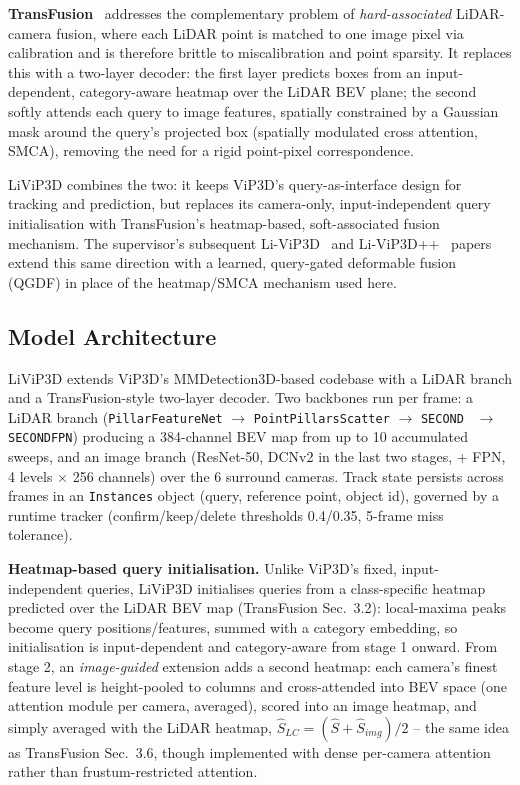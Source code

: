 \documentclass[12pt,a4paper]{report}
\begin{document}
\quad \textbf{TransFusion}~\cite{Bai2022TransFusion} addresses the complementary problem of \emph{hard-associated} LiDAR-camera fusion, where each LiDAR point is matched to one image pixel via calibration and is therefore brittle to miscalibration and point sparsity. It replaces this with a two-layer decoder: the first layer predicts boxes from an input-dependent, category-aware heatmap over the LiDAR BEV plane; the second softly attends each query to image features, spatially constrained by a Gaussian mask around the query's projected box (spatially modulated cross attention, SMCA), removing the need for a rigid point-pixel correspondence.

\quad LiViP3D combines the two: it keeps ViP3D's query-as-interface design for tracking and prediction, but replaces its camera-only, input-independent query initialisation with TransFusion's heatmap-based, soft-associated fusion mechanism. The supervisor's subsequent Li-ViP3D~\cite{Halinkovic2025LiViP3D} and Li-ViP3D++~\cite{Halinkovic2026LiViP3DPP} papers extend this same direction with a learned, query-gated deformable fusion (QGDF) in place of the heatmap/SMCA mechanism used here.

\subsection{Model Architecture}
\quad LiViP3D extends ViP3D's MMDetection3D-based codebase with a LiDAR branch and a TransFusion-style two-layer decoder. Two backbones run per frame: a LiDAR branch (\texttt{PillarFeatureNet} $\to$ \texttt{PointPillarsScatter} $\to$ \texttt{SECOND}~\cite{Yan2018SECOND} $\to$ \texttt{SECONDFPN}) producing a 384-channel BEV map from up to 10 accumulated sweeps, and an image branch (ResNet-50, DCNv2 in the last two stages, + FPN, 4 levels $\times$ 256 channels) over the 6 surround cameras. Track state persists across frames in an \texttt{Instances} object (query, reference point, object id), governed by a runtime tracker (confirm/keep/delete thresholds 0.4/0.35, 5-frame miss tolerance).

\quad \textbf{Heatmap-based query initialisation.} Unlike ViP3D's fixed, input-independent queries, LiViP3D initialises queries from a class-specific heatmap predicted over the LiDAR BEV map (TransFusion Sec.~3.2): local-maxima peaks become query positions/features, summed with a category embedding, so initialisation is input-dependent and category-aware from stage 1 onward. From stage 2, an \emph{image-guided} extension adds a second heatmap: each camera's finest feature level is height-pooled to columns and cross-attended into BEV space (one attention module per camera, averaged), scored into an image heatmap, and simply averaged with the LiDAR heatmap, $\hat S_{LC} = (\hat S + \hat S_{img})/2$ -- the same idea as TransFusion Sec.~3.6, though implemented with dense per-camera attention rather than frustum-restricted attention.
\end{document}
